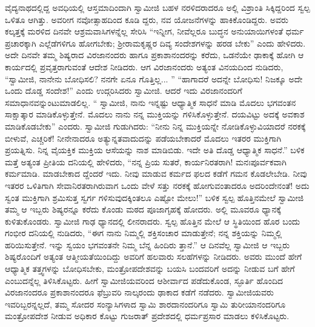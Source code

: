 ವೈದ್ಯನಾಥದಲ್ಲಿದ್ದ ಅವಧಿಯಲ್ಲಿ ಆಸ್ತಮಾದಿಂದಾಗಿ ಸ್ವಾಮೀಜಿ ಬಹಳ ನರಳಿದರಾದರೂ ಅಲ್ಲಿ ವಿಶ್ರಾಂತಿ ಸಿಕ್ಕಿದ್ದರಿಂದ ಸ್ವಲ್ಪ ಒಳಿತೂ ಆಗಿತ್ತು. ಅವರೀಗ ನವೋತ್ಸಾಹದಿಂದ ಕೂಡಿ ದ್ದರು, ನವ ಯೋಜನೆಗಳನ್ನು ಹಾಕಿಕೊಂಡಿದ್ದರು. ಅವರು ಕಲ್ಕತ್ತಕ್ಕೆ ಮರಳಿದ ದಿನವೇ ಆಶ್ರಮವಾಸಿಗಳನ್ನೆಲ್ಲ ಸೇರಿಸಿ “ಇನ್ನೀಗ, ನೀವೆಲ್ಲರೂ ಬುದ್ಧನ ಅನುಯಾಯಿಗಳಂತೆ ಧರ್ಮ ಪ್ರಚಾರಕ್ಕಾಗಿ ಎಲ್ಲೆಡೆಗಳಿಗೂ ಹೋಗಬೇಕು; ಶ್ರೀರಾಮಕೃಷ್ಣರ ದಿವ್ಯ ಸಂದೇಶಗಳನ್ನು ಹರಡ ಬೇಕು” ಎಂದು ಹೇಳಿದರು. ಅದೇ ದಿನವೇ ತಮ್ಮ ಶಿಷ್ಯರಾದ ವಿರಜಾನಂದರು ಹಾಗೂ ಪ್ರಕಾಶಾನಂದರನ್ನು ಕರೆದು, ಒಡನೆಯೇ ಢಾಕಾಕ್ಕೆ ಹೋಗಿ ಆ ಕಾರ್ಯದಲ್ಲಿ ಪ್ರವೃತ್ತರಾಗುವಂತೆ ಆದೇಶ ನೀಡಿದರು. ಆಗ ವಿರಜಾನಂದರು ಅತ್ಯಂತ ವಿನಯದಿಂದ ನುಡಿದರು, “ಸ್ವಾಮೀಜಿ, ನಾನೇನು ಬೋಧಿಸಲಿ? ನನಗೇ ಏನೂ ಗೊತ್ತಿಲ್ಲ... ” “ಹಾಗಾದರೆ ಅದನ್ನೇ ಬೋಧಿಸು! ನಿಜಕ್ಕೂ ಅದೇ ಒಂದು ದೊಡ್ಡ ಸಂದೇಶ!” ಎಂದು ಉದ್ಗರಿಸಿದರು ಸ್ವಾಮೀಜಿ. ಆದರೆ ಇದು ವಿರಜಾನಂದರಿಗೆ ಸಮಾಧಾನವನ್ನುಂಟುಮಾಡಲಿಲ್ಲ. “ ಸ್ವಾಮೀಜಿ, ನಾನು ಇನ್ನಷ್ಟು ಆಧ್ಯಾತ್ಮಿಕ ಸಾಧನೆ ಮಾಡಿ ಮೊದಲು ಭಗವಂತನ ಸಾಕ್ಷಾತ್ಕಾರ ಮಾಡಿಕೊಳ್ಳುತ್ತೇನೆ. ಮೊದಲು ನಾನು ನನ್ನ ಮುಕ್ತಿಯನ್ನು ಗಳಿಸಿಕೊಳ್ಳುತ್ತೇನೆ. ದಯವಿಟ್ಟು ಅದಕ್ಕೆ ಅವಕಾಶ ಮಾಡಿಕೊಡಬೇಕು” ಎಂದರು. ಸ್ವಾಮೀಜಿ ಗುಡುಗಿದರು: “ನೀನು ನಿನ್ನ ಮುಕ್ತಿಯನ್ನೇ ನೋಡಿಕೊಳ್ಳುವಿಯಾದರೆ ನರಕಕ್ಕೆ ಬೀಳುವೆ, ಎಚ್ಚರಿಕೆ! ನೀನೇನಾದರೂ ಅತ್ಯುನ್ನತವಾದುದನ್ನು ಪಡೆಯಬೇಕಾದರೆ ಮೊದಲು ಇತರರ ಮುಕ್ತಿಗಾಗಿ ಪ್ರಯತ್ನಿಸು. ನಿನ್ನ ವೈಯಕ್ತಿಕ ಮುಕ್ತಿಯ ಆಸೆಯನ್ನು ನಾಶ ಮಾಡಿಬಿಡು. ಇದೇ ಅತಿ ದೊಡ್ಡ ಆಧ್ಯಾತ್ಮಿಕ ಸಾಧನೆ.” ಬಳಿಕ ಮತ್ತೆ ಅತ್ಯಂತ ಪ್ರೀತಿಯ ದನಿಯಲ್ಲಿ ಹೇಳಿದರು, “ನನ್ನ ಪ್ರಿಯ ಸುತರೆ, ಕಾರ್ಯನಿರತರಾಗಿ! ಮನಃಪೂರ್ವಕವಾಗಿ ಕರ್ಮಮಾಡಿ. ಮಾಡಬೇಕಾದ ದ್ದೆಂದರೆ ಇದು. ನೀವು ಮಾಡುವ ಕರ್ಮದ ಫಲದ ಕಡೆಗೆ ಗಮನ ಕೊಡಲೇಬೇಡಿ. ನೀವು ಇತರರ ಒಳಿತಿಗಾಗಿ ಸೇವಾನಿರತರಾಗಿರುವಾಗ ಒಂದು ವೇಳೆ ಸತ್ತು ನರಕಕ್ಕೆ ಹೋಗುವಂತಾದರೂ ಅದರಿಂದೇನಂತೆ! ಅದು ಸ್ವಂತ ಮುಕ್ತಿಗಾಗಿ ಶ್ರಮಿಸುತ್ತ ಸ್ವರ್ಗ ಗಳಿಸುವುದಕ್ಕಿಂತಲೂ ಎಷ್ಟೋ ಮೇಲು!” ಬಳಿಕ ಸ್ವಲ್ಪ ಹೊತ್ತಿನಮೇಲೆ ಸ್ವಾಮೀಜಿ ತಮ್ಮ ಆ ಇಬ್ಬರು ಶಿಷ್ಯರನ್ನೂ ಕರೆದು ಕೊಂಡು ಮಠದ ಪೂಜಾಗೃಹಕ್ಕೆ ಹೋದರು. ಅಲ್ಲಿ ಮೂವರೂ ಧ್ಯಾನಕ್ಕೆ ಕುಳಿತುಕೊಂಡರು. ಸ್ವಾಮೀಜಿ ಗಾಢ ಧ್ಯಾನದಲ್ಲಿ ಲೀನರಾದರು. ಸ್ವಲ್ಪ ಹೊತ್ತಿನ ಮೇಲೆ ಆ ಸ್ಥಿತಿಯಿಂದ ಹೊರ ಬಂದು ಗಂಭೀರ ದನಿಯಲ್ಲಿ ನುಡಿದರು, “ಈಗ ನಾನು ನಿಮ್ಮಲ್ಲಿ ಶಕ್ತಿಸಂಚಾರ ಮಾಡುತ್ತೇನೆ; ನನ್ನ ಶಕ್ತಿಯನ್ನು ನಿಮ್ಮಲ್ಲಿ ಹರಿಯಿಸುತ್ತೇನೆ. ಇನ್ನು ಸ್ವಯಂ ಭಗವಂತನೇ ನಿಮ್ಮ ಬೆನ್ನ ಹಿಂದಿರು ತ್ತಾನೆ.” ಆ ದಿನವೆಲ್ಲ ಸ್ವಾಮೀಜಿ ಆ ಇಬ್ಬರು ಶಿಷ್ಯರೊಂದಿಗೆ ಅತ್ಯಂತ ಆತ್ಮೀಯತೆಯಿಂದಿದ್ದು ಅವರಿಗೆ ಹಲವಾರು ಸಲಹೆಗಳನ್ನು ನೀಡಿದರು. ಅವರು ಮುಂದೆ ಹೇಗೆ ಆಧ್ಯಾತ್ಮಿಕ ತತ್ತ್ವಗಳನ್ನು ಬೋಧಿಸಬೇಕು, ಮಂತ್ರೋಪದೇಶವನ್ನು ಬಯಸಿ ಬಂದವರಿಗೆ ಅದನ್ನು ನೀಡುವ ಬಗೆ ಹೇಗೆ ಎಂಬುದನ್ನೆಲ್ಲ ತಿಳಿಸಿಕೊಟ್ಟರು. ಹೀಗೆ ಸ್ವಾಮೀಜಿಯವರಿಂದ ಆಶೀರ್ವಾದ ಪಡೆದುಕೊಂಡ, ಸ್ಫೂರ್ತಿ ಹೊಂದಿದ ವಿರಜಾನಂದರೂ ಪ್ರಕಾಶಾನಂದರೂ ಫೆಬ್ರುವರಿ ನಾಲ್ಕರಂದು ಢಾಕಾದ ಕಡೆಗೆ ನಡೆದರು. ಸ್ವಾಮೀಜಿಯವರು ಇವರಿಬ್ಬರನ್ನಲ್ಲದೆ, ತಮ್ಮ ಸೋದರ ಸಂನ್ಯಾಸಿಗಳಾದ ಸ್ವಾಮಿ ಶಾರದಾನಂದರಿಗೂ ಸ್ವಾಮಿ ತುರೀಯಾನಂದರಿಗೂ ಮಂತ್ರೋಪದೇಶ ನೀಡುವ ಅಧಿಕಾರ ಕೊಟ್ಟು ಗುಜರಾತ್ ಪ್ರದೇಶದಲ್ಲಿ ಧರ್ಮಪ್ರಸಾರ ಮಾಡಲು ಕಳಿಸಿಕೊಟ್ಟರು.

